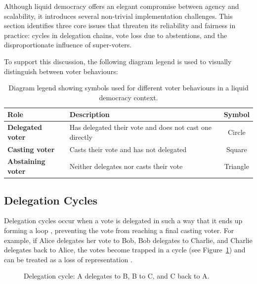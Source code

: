 Although liquid democracy offers an elegant compromise between agency and scalability, it introduces several non-trivial implementation challenges. This section identifies three core issues that threaten its reliability and fairness in practice: cycles in delegation chains, vote loss due to abstentions, and the disproportionate influence of super-voters.

To support this discussion, the following diagram legend is used to visually distinguish between voter behaviours:

\begin{table}[H]
  \centering
  \begin{tabular}{|l|l|c|}
  \hline
  \textbf{Role} & \textbf{Description} & \textbf{Symbol}\\ \hline
  \textbf{Delegated voter} & Has delegated their vote and does not cast one directly & Circle \\
  \textbf{Casting voter} & Casts their vote and has not delegated & Square \\
  \textbf{Abstaining voter} & Neither delegates nor casts their vote & Triangle \\
  \hline
  \end{tabular}
  \caption{Diagram legend showing symbols used for different voter behaviours in a liquid democracy context.}
\end{table}  

\subsection*{Delegation Cycles}\label{subsec:delegation_cycles}
Delegation cycles occur when a vote is delegated in such a way that it ends up forming a loop \citep{brill_liquid_2022}, preventing the vote from reaching a final casting voter. For example, if Alice delegates her vote to Bob, Bob delegates to Charlie, and Charlie delegates back to Alice, the votes become trapped in a cycle (see Figure~\ref{fig:triangle-cycle}) and can be treated as a loss of representation \citep{christoff2017liquiddemocracyanalysisbinary}.

\begin{figure}[H]
  \centering
  \caption{Delegation cycle: A delegates to B, B to C, and C back to A.}
  \label{fig:triangle-cycle}
\end{figure}

